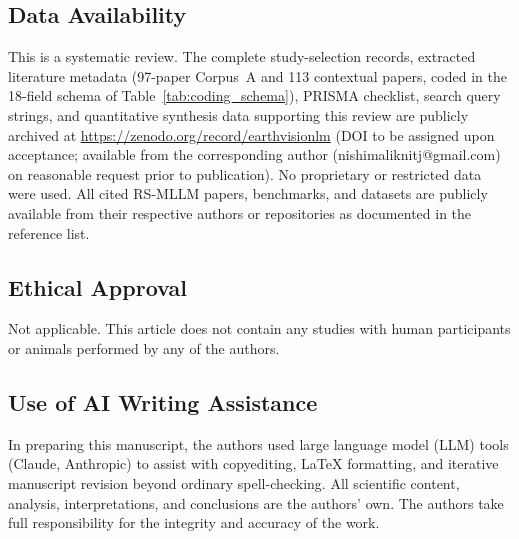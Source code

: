\documentclass[pdflatex,sn-mathphys-num]{sn-jnl}
\begin{document}
\subsection*{Data Availability}
This is a systematic review. The complete study-selection records, extracted
literature metadata (97-paper Corpus~A and 113 contextual papers, coded in the 18-field schema of
Table~\ref{tab:coding_schema}), PRISMA checklist, search query strings, and
quantitative synthesis data supporting this review are publicly archived at
\url{https://zenodo.org/record/earthvisionlm} (DOI to be assigned upon
acceptance; available from the corresponding author (nishimaliknitj@gmail.com) on reasonable request
prior to publication). No proprietary or restricted data were used.
All cited RS-MLLM papers, benchmarks, and datasets are publicly available
from their respective authors or repositories as documented in the reference list.

\subsection*{Ethical Approval}
Not applicable. This article does not contain any studies with human
participants or animals performed by any of the authors.

\subsection*{Use of AI Writing Assistance}
In preparing this manuscript, the authors used large language model (LLM)
tools (Claude, Anthropic) to assist with copyediting, LaTeX formatting,
and iterative manuscript revision beyond ordinary spell-checking.
All scientific content, analysis, interpretations, and conclusions are the
authors' own. The authors take full responsibility for the integrity and
accuracy of the work.


\end{document}
